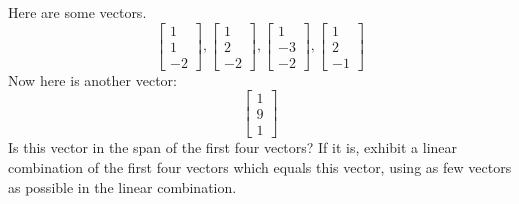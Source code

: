 \documentclass{ximera}
\begin{document}
\begin{problem}\label{prb:3.10} Here are some vectors.
\begin{equation*}
\left[
\begin{array}{r}
1 \\
1 \\
-2
\end{array}
\right] ,\left[
\begin{array}{r}
1 \\
2 \\
-2
\end{array}
\right] ,\left[
\begin{array}{r}
1 \\
-3 \\
-2
\end{array}
\right] ,\left[
\begin{array}{r}
1 \\
2 \\
-1
\end{array}
\right]
\end{equation*}
Now here is another vector:\
\begin{equation*}
\left[
\begin{array}{r}
1 \\
9 \\
1
\end{array}
\right]
\end{equation*}
Is this vector in the span of the first four vectors? If it is, exhibit a
linear combination of the first four vectors which equals this vector, using
as few vectors as possible in the linear combination.
\end{problem}
\end{document}
